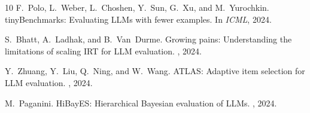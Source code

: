 \documentclass[letterpaper, 10pt, twocolumn]{article}
\begin{document}
\begin{thebibliography}{10}
F.~Polo, L.~Weber, L.~Choshen, Y.~Sun, G.~Xu, and M.~Yurochkin.
\newblock tinyBenchmarks: Evaluating LLMs with fewer examples.
\newblock In {\em ICML}, 2024.

S.~Bhatt, A.~Ladhak, and B.~Van~Durme.
\newblock Growing pains: Understanding the limitations of scaling IRT for LLM evaluation.
, 2024.

Y.~Zhuang, Y.~Liu, Q.~Ning, and W.~Wang.
\newblock ATLAS: Adaptive item selection for LLM evaluation.
, 2024.

M.~Paganini.
\newblock HiBayES: Hierarchical Bayesian evaluation of LLMs.
, 2024.

\end{thebibliography}
\end{document}
